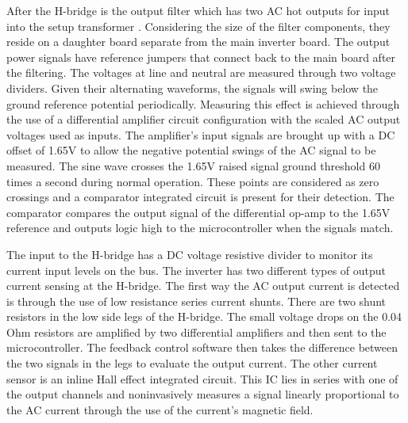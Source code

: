 After the H-bridge is the output filter which has two AC hot outputs  for input into the setup transformer . Considering the size of the filter components, they reside on a daughter  board separate from the main inverter board. The output power signals have reference jumpers that connect back to the main board after the filtering. The voltages at line and neutral are measured through two voltage dividers. Given their alternating waveforms, the signals will swing below the ground reference potential periodically. Measuring this effect is achieved through the use of a differential amplifier circuit configuration with the scaled AC output voltages used as inputs. The amplifier's input signals are brought up with a DC offset of 1.65V to allow the negative potential swings of the AC signal to be measured. The sine wave crosses the 1.65V raised signal ground threshold 60 times a second during normal operation. These points are considered as zero crossings and a comparator integrated circuit is present for their detection. The comparator compares the output signal of the differential op-amp to the 1.65V reference and outputs logic high to the microcontroller when the signals match. 

The input to the H-bridge has a DC voltage resistive divider to monitor its current input levels on the bus. The inverter has two different types of output current sensing at the H-bridge. The first way the AC output current is detected is through the use of low resistance series current shunts. There are two shunt resistors in the low side legs of the H-bridge. The small voltage drops on the 0.04 Ohm resistors are amplified by two differential amplifiers and then sent to the microcontroller. The feedback control software then takes the difference between the two signals in the legs to evaluate the output current. The other current sensor is an inline Hall effect integrated circuit. This IC lies in series with one of the output channels and noninvasively measures a signal linearly proportional to the AC current through the use of the current's magnetic field.

